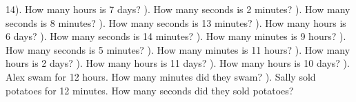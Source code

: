 \documentclass{article}%
\begin{document}
14). How many hours is 7 days?%
\newline%
\newline%
). How many seconds is 2 minutes?%
\newline%
\newline%
). How many seconds is 8 minutes?%
\newline%
\newline%
). How many seconds is 13 minutes?%
\newline%
\newline%
). How many hours is 6 days?%
\newline%
\newline%
). How many seconds is 14 minutes?%
\newline%
\newline%
). How many minutes is 9 hours?%
\newline%
\newline%
). How many seconds is 5 minutes?%
\newline%
\newline%
). How many minutes is 11 hours?%
\newline%
\newline%
). How many hours is 2 days?%
\newline%
\newline%
). How many hours is 11 days?%
\newline%
\newline%
). How many hours is 10 days?%
\newline%
\newline%
). Alex swam for 12 hours. How many minutes did they swam?%
\newline%
\newline%
). Sally sold potatoes for 12 minutes. How many seconds did they sold potatoes?%
\newline%
\newline%
\end{document}
